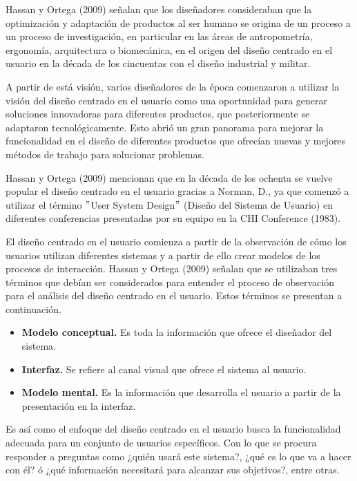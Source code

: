 Hassan y Ortega (2009) señalan que los diseñadores consideraban que la optimización y adaptación de productos al ser humano  se origina de un proceso a un proceso de investigación, en particular en las áreas de antropometría, ergonomía, arquitectura o biomecánica, en el origen del diseño centrado en el usuario en la década de los cincuentas con el diseño industrial y militar.

A partir de está visión, varios diseñadores de la época comenzaron a utilizar la visión del diseño centrado en el usuario como una oportunidad para generar soluciones innovadoras para diferentes productos, que posteriormente se adaptaron tecnológicamente. Esto abrió un gran panorama para mejorar la funcionalidad en el diseño de diferentes productos que ofrecían nuevas y mejores métodos de trabajo para solucionar problemas.

Hassan y Ortega (2009) mencionan que en la década de los ochenta se vuelve popular el diseño centrado en el usuario gracias a Norman, D., ya que comenzó a utilizar el término $"$User System Design$"$ (Diseño del Sistema de Usuario) en diferentes conferencias presentadas por su equipo en la CHI Conference (1983).

El diseño centrado en el usuario comienza a partir de la observación de cómo los usuarios utilizan diferentes sistemas y a partir de ello crear modelos de los procesos de interacción. Hassan y Ortega (2009) señalan que se utilizaban tres términos que debían ser considerados para entender el proceso de observación para el análisis del diseño centrado en el usuario. Estos términos se presentan a continuación.

\begin{itemize}
  \item \textbf{Modelo conceptual.} Es toda la información que ofrece el diseñador del sistema.
  \item \textbf{Interfaz.} Se refiere al canal visual que ofrece el sistema al usuario.
  \item \textbf{Modelo mental.} Es la información que desarrolla el usuario a partir de la presentación en la interfaz.
\end{itemize}

Es así como el enfoque del diseño centrado en el usuario busca la funcionalidad adecuada para un conjunto de usuarios específicos. Con lo que se procura responder a preguntas como ¿quién usará este sistema?, ¿qué es lo que va a hacer con él? ó ¿qué información necesitará para alcanzar sus objetivos?, entre otras.

